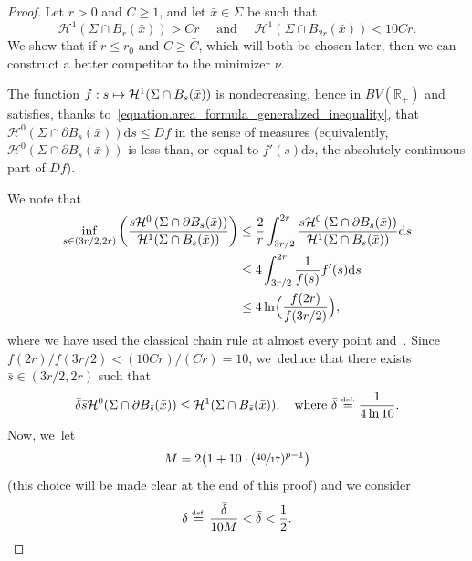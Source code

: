 \documentclass[JEP,XML,SOM,Unicode,NoFloatCountersInSection,published]{cedram}
\newcommand\mto{\mathchoice{\longmapsto}{\mapsto}{\mapsto}{\mapsto}}
\theoremstyle{definition}
\newcommand{\eqdef}{\ensuremath{\stackrel{\mbox{\upshape\tiny def.}}{=}}}
\newcommand\cH{\mathcal{H}}
\newcommand{\RR}{\mathbb{R}}
\newcommand\dd{\mathrm{d}}
\begin{document}
\begin{proof}
Let $r> 0$ and $C\ge 1$, and let $\bar x\in\Sigma$ be such that
\begin{equation}\label{eq.bounds_length}
\cH^1(\Sigma\cap B_r(\bar x))> Cr
\quad \text{ and }\quad
\cH^1(\Sigma\cap B_{2r}(\bar x))< 10Cr.
\end{equation}
We show that if $r\le r_0$ and $C\ge \bar C$, which will both be chosen later, then we can construct a better competitor to the minimizer $\nu$.

The function $f: s \mto \cH^1(\Sigma\cap B_s(\bar x))$ is nondecreasing, hence
in $BV(\RR_+)$ and satisfies, thanks to~\eqref{equation.area_formula_generalized_inequality}, that $\cH^0(\Sigma\cap \partial B_s(\bar x))\dd s\le Df$ in the sense of measures
(equivalently, $\cH^0(\Sigma\cap\partial B_s(\bar x))$ is less than, or equal to $f'(s)\dd s$, the absolutely continuous part of $Df$).

We note that
\begin{align*}
\inf_{s \in (3r/2,2r)} \left(\frac{s\cH^0\left(\Sigma\cap\partial B_s(\bar x)\right)}{\cH^1(\Sigma\cap B_{s}(\bar x))}\right)
&\le \frac{2}{r}\int_{3r/2}^{2r}\frac{s\cH^0\left(\Sigma\cap\partial B_s(\bar x)\right)}{\cH^1(\Sigma\cap B_{ s}(\bar x))} \dd s\\
&\le 4\int_{3r/2}^{2r} \frac{1}{f(s)} f'(s)\dd s \\
&\leq 4\ln \Bigl(\frac{f(2r)}{f(3r/2)}\Bigr),
\end{align*}
where we have used the classical chain rule at almost every point and~\cite[Cor.\,3.29]{ambrosio2000functions}. Since $f(2r)/f(3r/2)<(10Cr)/(Cr)=10$, we~deduce that there exists $\bar s\in (3r/2,2r)$ such that
\begin{equation}\label{eq:estimbars}
\bar\delta \bar s\cH^0(\Sigma\cap\partial B_{\bar s}(\bar x)) \le \cH^1(\Sigma\cap B_{\bar s}(\bar x)), \quad \text{where }\bar \delta \eqdef \frac{1}{4\ln 10}.
\end{equation}
Now, we~let
\begin{equation}\label{eq:M}
M= 2 \bigl( 1+10\cdot(\sfrac{40}{17})^{p-1} \bigr)
\end{equation}
(this choice will be made clear at the end of this proof) and we consider
\begin{equation}\label{eq:delta}
\delta \eqdef \frac{\bar\delta}{10M} <\bar \delta<\frac{1}{2}.
\end{equation}


\end{proof}
\end{document}
